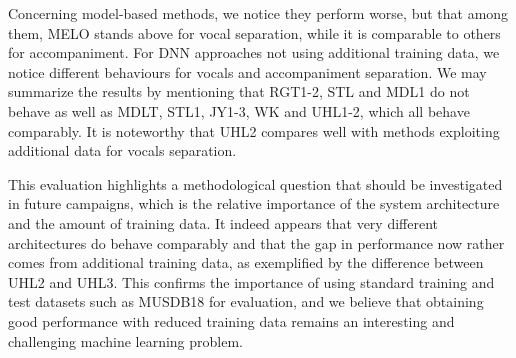 \documentclass{llncs}
\begin{document}
Concerning model-based methods, we notice they perform worse, but that among them, MELO stands above for vocal separation, while it is comparable to others for accompaniment. For DNN approaches not using additional training data, we notice different behaviours for vocals and accompaniment separation. We may summarize the results by mentioning that RGT1-2, STL and MDL1 do not behave as well as MDLT, STL1, JY1-3, WK and UHL1-2, which all behave comparably. It is noteworthy that UHL2 compares well with methods exploiting additional data for vocals separation.

 This evaluation highlights a methodological question that should be investigated in future campaigns, which is the relative importance of the system architecture and the amount of training data. It indeed appears that very different architectures do behave comparably and that the gap in performance now rather comes from additional training data, as exemplified by the difference between UHL2 and UHL3. This confirms the importance of using standard training and test datasets such as MUSDB18 for evaluation, and we believe that obtaining good performance with reduced training data remains an interesting and challenging machine learning problem.
\end{document}
